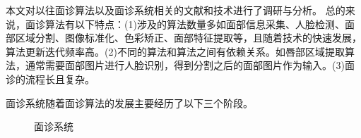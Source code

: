 本文对以往面诊算法以及面诊系统相关的文献和技术进行了调研与分析。
总的来说，面诊算法有以下特点：(1)涉及的算法数量多如面部信息采集、人脸检测、面部区域分割、图像标准化、色彩矫正、面部特征提取等\cite{宋海贝2018中医面诊信息自动识别方法研究进展}，且随着技术的快速发展，算法更新迭代频率高\cite{esteva2021deep}。(2)不同的算法和算法之间有依赖关系。如唇部区域提取算法，通常需要面部图片进行人脸识别，得到分割之后的面部图片作为输入\cite{Hu2016Robust}。(3)面诊的流程长且复杂\cite{林锋2019中医面诊系统调研报告}。

面诊系统随着面诊算法的发展主要经历了以下三个阶段。

\begin{figure}[h]
    \centering
    \caption{面诊系统}
    \label{fig:med}
\end{figure}


